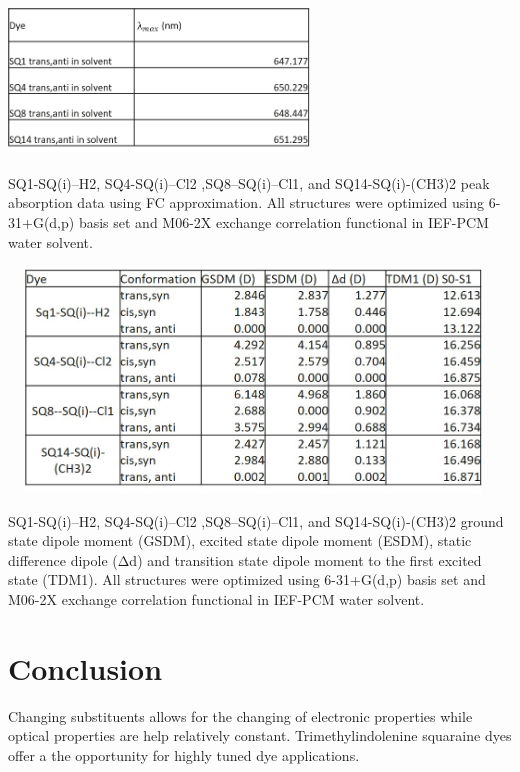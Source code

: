 \documentclass[journal=jacsat,manuscript=article]{achemso}
\begin{document}
\newpage
\begin{table}[h]
    \centering
    \includegraphics[width=8cm,height=4cm]{figures/sq1_4_8_14-table.png}
    \caption{SQ1-SQ(i)--H2, SQ4-SQ(i)--Cl2 ,SQ8--SQ(i)--Cl1, and SQ14-SQ(i)-(CH3)2 peak absorption data using FC approximation. All structures were optimized using 6-31+G(d,p) basis set and M06-2X exchange correlation functional in IEF-PCM water solvent.}
    \label{tab:my_label}
\end{table}
\begin{table}[h]
    \centering
    \includegraphics[width=13cm,height=6cm]{SQ1_4_8_14_electronic_table.jpg}
        \caption{SQ1-SQ(i)--H2, SQ4-SQ(i)--Cl2 ,SQ8--SQ(i)--Cl1, and SQ14-SQ(i)-(CH3)2 ground state dipole moment (GSDM), excited state dipole moment (ESDM), static difference dipole (Δd) and transition state dipole moment to the first excited state (TDM1). All structures were optimized using 6-31+G(d,p) basis set and M06-2X exchange correlation functional in IEF-PCM water solvent.}
    \label{tab:my_label}
\end{table}
\newpage
\newpage
\newpage
\section{Conclusion}
Changing substituents allows for the changing of electronic properties while optical properties are help relatively constant. Trimethylindolenine squaraine dyes offer a the opportunity for highly tuned dye applications.

\newpage
 

\end{document}
